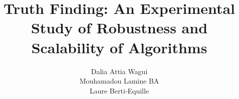 \documentclass{vldb}
\begin{document}
\title{Truth Finding: An Experimental Study of Robustness and Scalability of Algorithms}
\author{
\alignauthor
Dalia Attia Wagui\\
\alignauthor
Mouhamadou Lamine BA\\
\alignauthor 
Laure Berti-Equille\\
}%
\maketitle
\end{document}
